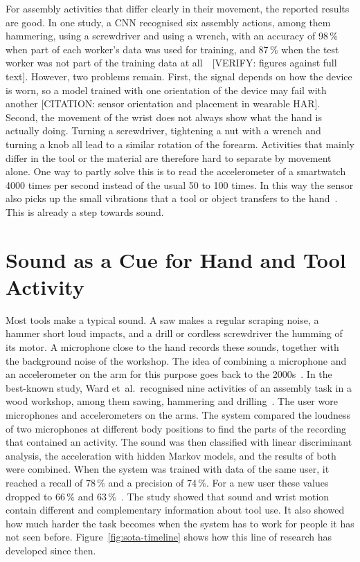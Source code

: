 For assembly activities that differ clearly in their movement, the reported
results are good. In one study, a CNN recognised six assembly actions, among
them hammering, using a screwdriver and using a wrench, with an accuracy of
98\,\% when part of each worker's data was used for training, and 87\,\% when
the test worker was not part of the training data at
all~\cite{tao2018worker}~[VERIFY: figures against full text]. However, two
problems remain. First, the signal depends on how the device is worn, so a model
trained with one orientation of the device may fail with another
{[}CITATION: sensor orientation and placement in wearable HAR{]}. Second, the
movement of the wrist does not always show what the hand is actually doing.
Turning a screwdriver, tightening a nut with a wrench and turning a knob all
lead to a similar rotation of the forearm. Activities that mainly differ in the
tool or the material are therefore hard to separate by movement alone.
One way to partly solve this is to read the accelerometer of a smartwatch 4000
times per second instead of the usual 50 to 100 times. In this way the sensor
also picks up the small vibrations that a tool or object
transfers to the hand~\cite{laput2019sensing}. This is already a step towards
sound.

\section{Sound as a Cue for Hand and Tool Activity}
\label{sec:sota-audio}

Most tools make a typical sound. A saw makes a regular scraping noise, a hammer
short loud impacts, and a drill or cordless screwdriver the humming of its
motor. A microphone close to the hand records these sounds, together with the
background noise of the workshop. The idea of combining a microphone and an
accelerometer on the arm for this purpose goes back to the
2000s~\cite{lukowicz2004recognizing}. In the best-known study, Ward et~al.\
recognised nine activities of an assembly task in a wood workshop, among them
sawing, hammering and drilling~\cite{ward2006activity}. The user wore
microphones and accelerometers on the arms. The system compared the loudness of
two microphones at different body positions to find the parts of the recording
that contained an activity. The sound was then classified with linear
discriminant analysis, the acceleration with hidden Markov models, and the
results of both were combined. When the system was trained with data of the
same user, it reached a recall of 78\,\% and a precision of 74\,\%. For a new
user these values dropped to 66\,\% and 63\,\%~\cite{ward2006activity}. The
study showed that sound and wrist motion contain different and complementary
information about tool use. It also showed how much harder the task becomes
when the system has to work for people it has not seen before.
Figure~\ref{fig:sota-timeline} shows how this line of research has developed
since then.

